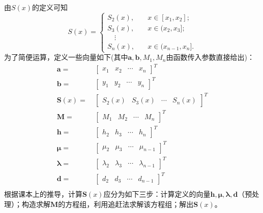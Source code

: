 \documentclass[12pt, a4paper, oneside]{ctexart}
\begin{document}
由$S(x)$的定义可知
\begin{equation*}
    S(x) = 
    \begin{cases}
        S_2(x),&\quad x\in[x_1,x_2];\\
        S_3(x),&\quad x\in(x_2,x_3];\\
        \quad \vdots&\quad\\
        S_n(x),&\quad x\in(x_{n-1},x_n].
    \end{cases}
\end{equation*}
为了简便运算，定义一些向量如下(其中$\boldsymbol{a},\boldsymbol{b},M_1,M_n$由函数传入参数直接给出)：
\begin{equation*}
    \begin{aligned}
        \boldsymbol{a} =&\ \left[\begin{matrix}
            x_1&x_2&\cdots&x_n
        \end{matrix}\right]^T\\
        \boldsymbol{b} =&\ \left[\begin{matrix}
            y_1&y_2&\cdots&y_n
        \end{matrix}\right]^T\\
        \boldsymbol{S}(x) =&\ \left[\begin{matrix}
            S_2(x)&S_3(x)&\cdots&S_n(x)
        \end{matrix}\right]^T\\
        \boldsymbol{M} =&\ [\begin{matrix}
            M_1& M_2&\cdots& M_n
        \end{matrix}]^T\\
        \boldsymbol{h} =&\ [\begin{matrix}
            h_2&h_3&\cdots&h_n
        \end{matrix}]^T\\
        \boldsymbol{\mu} =&\ [\begin{matrix}
            \mu_2&\mu_3&\cdots&\mu_{n-1}
        \end{matrix}]^T\\
        \boldsymbol{\lambda} =&\ \left[\begin{matrix}
            \lambda_2&\lambda_3&\cdots&\lambda_{n-1}
        \end{matrix}\right]^T\\
        \boldsymbol{d} =&\ \left[\begin{matrix}
            d_2&d_3&\cdots&d_{n-1}
        \end{matrix}\right]^T\\
    \end{aligned}
\end{equation*}
根据课本上的推导，计算$\boldsymbol{S}(x)$应分为如下三步：计算定义的向量$\boldsymbol{h},\boldsymbol{\mu}, \boldsymbol{\lambda}, \boldsymbol{d}$（预处理）；构造求解$\boldsymbol{M}$的方程组，利用追赶法求解该方程组；解出$\boldsymbol{S}(x)$。
\end{document}
